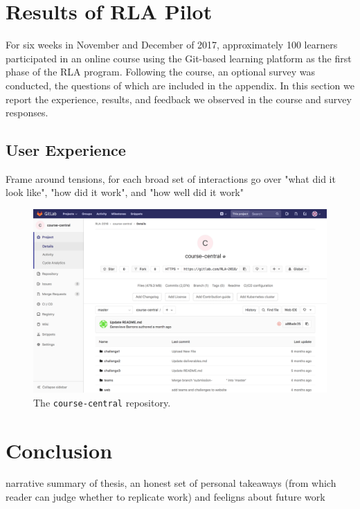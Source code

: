 \documentclass[12pt,twoside,vi]{mitthesis}
\newcommand{\draft}[1]{{\color{blue} #1}}
\begin{document}
\chapter{Results of RLA Pilot}

For six weeks in November and December of 2017, approximately 100 learners participated in an online course using the Git-based learning platform as the first phase of the RLA program. Following the course, an optional survey was conducted, the questions of which are included in the appendix. In this section we report the experience, results, and feedback we observed in the course and survey responses.

\section{User Experience}

\draft{Frame around tensions, for each broad set of interactions go over "what did it look like", "how did it work", and "how well did it work"}

\begin{figure}[H]
\centering
\includegraphics[scale=0.3]{fig-course-central.png}
\caption{The \texttt{course-central} repository.}
\end{figure}

\chapter{Conclusion}

\draft{narrative summary of thesis, an honest set of personal takeaways (from which reader can judge whether to replicate work) and feeligns about future work}

\appendix
\end{document}
